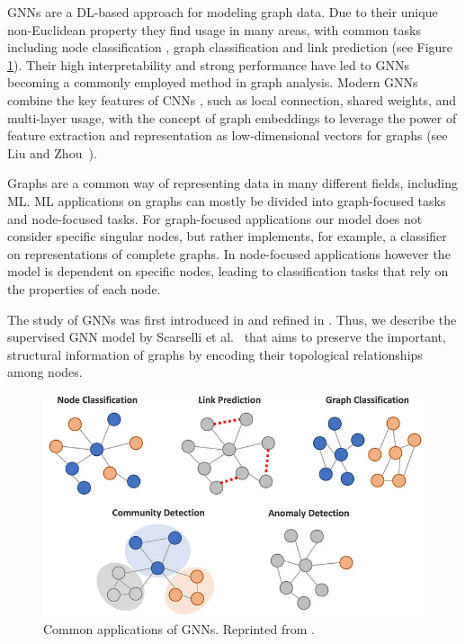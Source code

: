 \acp{GNN} \cite{4700287} are a DL-based approach for modeling graph data. Due to their unique non-Euclidean property they find usage in many areas, with common tasks including node classification \cite{gao2019graph}, graph classification \cite{xu2018powerful} and link prediction \cite{zhang2018link} (see Figure \ref{fig:gnn_tasks}). Their high interpretability and strong performance have led to GNNs becoming a commonly employed method in graph analysis. Modern GNNs combine the key features of \acp{CNN} \cite{726791}, such as local connection, shared weights, and multi-layer usage, with the concept of graph embeddings \cite{cai2018comprehensive} to leverage the power of feature extraction and representation as low-dimensional vectors for graphs (see Liu and Zhou~\cite{Liu2020}).\bigskip

Graphs are a common way of representing data in many different fields, including ML. ML applications on graphs can mostly be divided into graph-focused tasks and node-focused tasks. For graph-focused applications our model does not consider specific singular nodes, but rather implements, for example, a classifier on representations of complete graphs. In node-focused applications however the model is dependent on specific nodes, leading to classification tasks that rely on the properties of each node.

The study of GNNs was first introduced in \cite{gori2005new} and refined in \cite{4700287}. Thus, we describe the supervised GNN model by Scarselli et al.~\cite{4700287} that aims to preserve the important, structural information of graphs by encoding their topological relationships among nodes. \bigskip

\begin{figure}
    \includegraphics[width=\textwidth]{img/graph_tasks.png}
    \caption[Common applications of GNNs]{Common applications of GNNs. Reprinted from \cite{masui2022gnn}.}
    \label{fig:gnn_tasks}
\end{figure}

